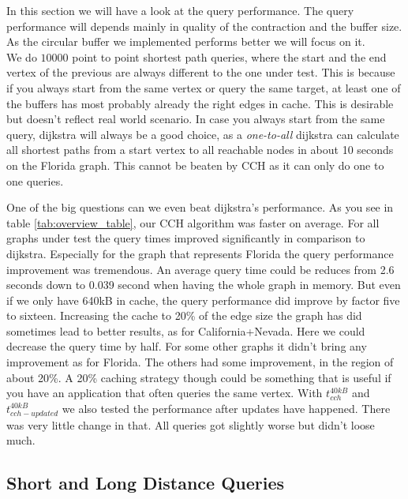 In this section we will have a look at the query performance. The query performance will depends mainly in quality of the contraction and the buffer size. 
As the circular buffer we implemented performs better we will focus on it. 
\\ We do $10000$ point to point shortest path queries, where the start and the end vertex of the previous are always different to the one under test. This is because if you 
always start from the same vertex or query the same target, at least one of the buffers has most probably already the right edges in cache. This is desirable but doesn't reflect real world scenario.
In case you always start from the same query, dijkstra will always be a good choice, as a \textit{one-to-all} dijkstra can calculate all shortest paths from a start vertex to all reachable nodes in about 10 seconds on the Florida graph.
This cannot be beaten by CCH as it can only do one to one queries.

One of the big questions can we even beat dijkstra's performance. As you see in table \ref{tab:overview_table}, our 
CCH algorithm was faster on average. For all graphs under test the query times improved significantly in comparison to dijkstra. Especially for the graph that represents Florida the query performance improvement 
was tremendous. An average query time could be reduces from 2.6 seconds down to 0.039 second when having the whole graph in memory. But even if we only have 640kB in cache, the query performance did improve by factor five to sixteen. 
Increasing the cache to 20\% of the edge size the graph has did sometimes lead to better results, as for California+Nevada. Here we could decrease the query time by half. For some other graphs it didn't bring any improvement as for Florida.
The others had some improvement, in the region of about 20\%. A 20\% caching strategy though could be something that is useful if you have an application that often queries the same vertex.
With $t^{40kB}_{cch}$ and $t^{40kB}_{cch-updated}$ we also tested the performance after updates have happened. There was very little change in that. All queries got slightly worse but didn't loose much.

\subsection{Short and Long Distance Queries}

